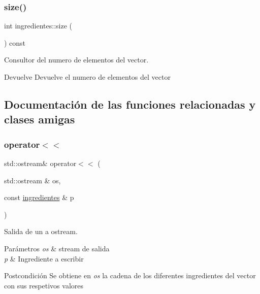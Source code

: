 \subsubsection{\texorpdfstring{size()}{size()}}
{\footnotesize\ttfamily int ingredientes\+::size (\begin{DoxyParamCaption}{ }\end{DoxyParamCaption}) const}



Consultor del numero de elementos del vector. 

\begin{DoxyReturn}{Devuelve}
Devuelve el numero de elementos del vector 
\end{DoxyReturn}


\subsection{Documentación de las funciones relacionadas y clases amigas}
\mbox{\label{classingredientes_a47b68f377e21ce26320b8adb9c72f347}} 
\subsubsection{\texorpdfstring{operator$<$$<$}{operator<<}}
{\footnotesize\ttfamily std\+::ostream\& operator$<$$<$ (\begin{DoxyParamCaption}\item[{std\+::ostream \&}]{os,  }\item[{const \hyperlink{classingredientes}{ingredientes} \&}]{p }\end{DoxyParamCaption})\hspace{0.3cm}{\ttfamily [friend]}}



Salida de un a ostream. 


\begin{DoxyParams}{Parámetros}
{\em os} & stream de salida \\
\hline
{\em p} & Ingrediente a escribir \\
\hline
\end{DoxyParams}
\begin{DoxyPostcond}{Postcondición}
Se obtiene en {\itshape os} la cadena de los diferentes ingredientes del vector con sus respetivos valores 
\end{DoxyPostcond}
\mbox{\label{classingredientes_adfbb6b2de8bd8b193715a3d58c313b84}} 
